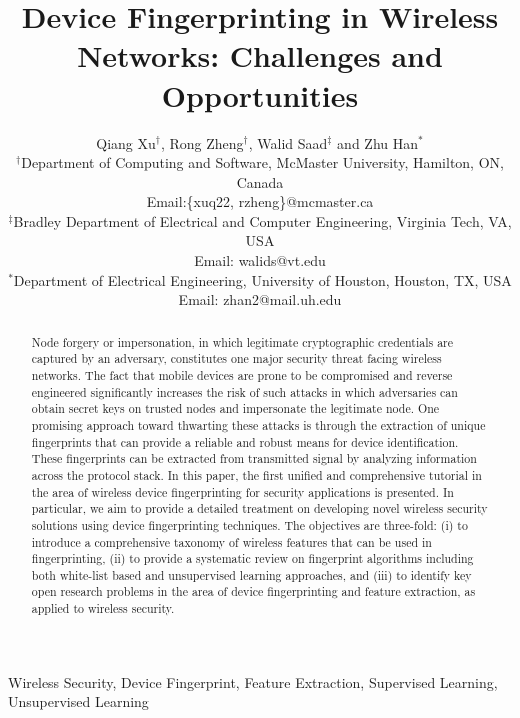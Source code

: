 \documentclass[journal,draftcls,onecolumn,11pt]{IEEEtran}
\newcounter{ctr}\setcounter{ctr}{0}
\begin{document}
\title{ Device Fingerprinting in Wireless Networks: Challenges and Opportunities}
\author{Qiang Xu$^\dag$, Rong Zheng$^\dag$, Walid Saad$^\ddag$ and Zhu Han$^*$ \\
$^\dag$Department of Computing and Software, McMaster University, Hamilton, ON, Canada\\
Email:\{xuq22, rzheng\}@mcmaster.ca \\
$^\ddag$Bradley Department of Electrical and Computer Engineering, Virginia Tech, VA, USA \\
Email: walids@vt.edu \\
$^*$Department of Electrical Engineering, University of Houston, Houston, TX, USA \\
Email: zhan2@mail.uh.edu
}

\maketitle 
\begin{abstract} 
Node forgery or impersonation, in which legitimate cryptographic credentials are captured by an adversary, constitutes one major security threat facing wireless networks. The fact that mobile devices are prone to be compromised and reverse engineered significantly increases the risk of such attacks in which adversaries can obtain secret keys on trusted nodes and impersonate the legitimate node. One promising approach toward thwarting these attacks is through the extraction of unique fingerprints that can provide a reliable and robust means for device identification. These fingerprints can be extracted from transmitted signal by analyzing information across the protocol stack. In this paper, the first unified and comprehensive tutorial in the area of wireless device fingerprinting for security applications is presented. In particular, we aim to provide a detailed treatment on developing novel wireless security solutions using device fingerprinting techniques. The objectives are three-fold: (i) to introduce a comprehensive taxonomy of wireless features that can be used in fingerprinting, (ii) to provide a systematic review on fingerprint algorithms including both white-list based and unsupervised learning approaches, and (iii) to identify key open research problems in the area of device fingerprinting and feature extraction, as applied to wireless security. 
\end{abstract}

\begin{keywords} 
Wireless Security, Device Fingerprint, Feature Extraction, Supervised Learning, Unsupervised Learning 
\end{keywords}
\end{document}
